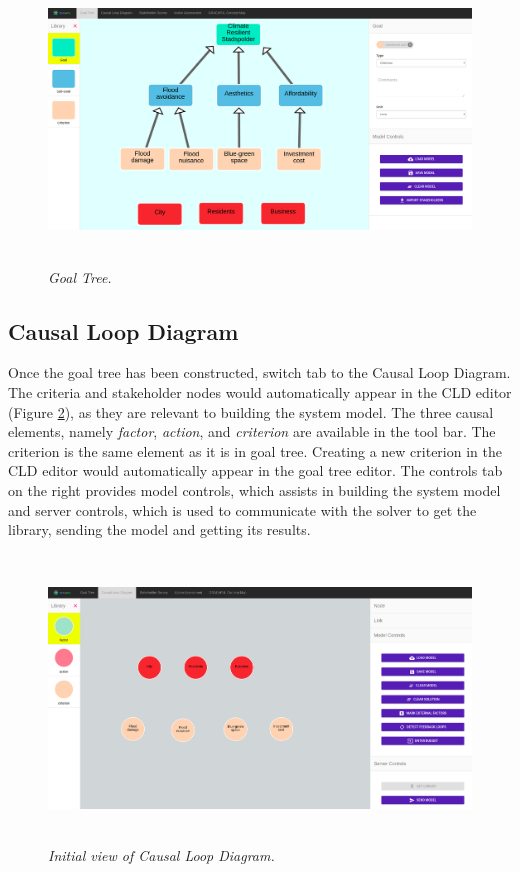 \documentclass[a4paper]{article}
\begin{document}
\begin{figure}[H]
\begin{center}
\includegraphics[height=3in,width=5in]{img/goal_tree.png}
\caption{\small \sl Goal Tree.\label{fig:goal_tree}}
\end{center}
\end{figure}

\subsection{Causal Loop Diagram}

Once the goal tree has been constructed, switch tab to the Causal Loop Diagram. The criteria and stakeholder nodes would automatically appear in the CLD editor (Figure \ref{fig:cld1}), as they are relevant to building the system model. The three causal elements, namely \textit{factor}, \textit{action}, and \textit{criterion} are available in the tool bar. The criterion is the same element as it is in goal tree. Creating a new criterion in the CLD editor would automatically appear in the goal tree editor. The controls tab on the right provides model controls, which assists in building the system model and server controls, which is used to communicate with the solver to get the library, sending the model and getting its results.

\begin{figure}[H]
\begin{center}
\includegraphics[height=3in,width=5in]{img/cld1.png}
\caption{\small \sl Initial view of Causal Loop Diagram.\label{fig:cld1}}
\end{center}
\end{figure}
\end{document}
